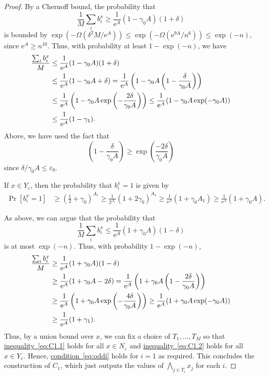 \documentclass[11pt]{article}
\numberwithin{equation}{section}
\theoremstyle{definition}
\theoremstyle{plain}
\newcommand{\eee}{\mathrm e}
\newcommand{\expeqref}[2]{\hyperref[#2]{#1~\eqref{#2}}}
\newcommand{\prob}[2]{\mathop{\mathrm{Pr}}_{#1}[#2]}
\begin{document}
\begin{proof}
By a Chernoff bound, the probability that
\[
  \frac{1}{M}\sum_i b_i^x\geq \frac{1}{\eee^A}(1-\gamma_0A)(1+\delta)
\]
is bounded by
$\exp(-\Omega(\delta^2M/\eee^A))\leq \exp(-\Omega(\eee^{9A}/n^6))\leq
\exp(-n)$, since $\eee^A \geq n^{10}$. Thus, with probability at least
$1-\exp(-n)$, we have
\begin{align}
\frac{\sum_i b_i^x}{M}&\leq \frac{1}{\eee^A}(1-\gamma_0A)(1+\delta)\notag\\
&\leq \frac{1}{\eee^A}(1-\gamma_0A + \delta) = \frac{1}{\eee^A}\left(1-\gamma_0A\left(1-\frac{\delta}{\gamma_0A}\right)\right)\notag\\
&\leq \frac{1}{\eee^A}\left(1-\gamma_0A\exp\left(-\frac{2\delta}{\gamma_0A}\right)\right)\leq \frac{1}{\eee^A}(1-\gamma_0A\exp(-\gamma_0A))\notag\\
&\leq \frac{1}{\eee^A}(1-\gamma_1).\label{eq:C1.1}
\end{align}
%
Above, we have used the fact that
\[
  \left(1-\frac{\delta}{\gamma_0A}\right)\geq \exp\left(\frac{-2\delta}{\gamma_0A}\right)
\]
since $\delta/\gamma_0A \leq \varepsilon_0$.

If $x\in Y_\varepsilon$, then the probability that $b_i^x = 1$ is given by 
\begin{align*}
\prob{}{b_i^x = 1} &\geq \left(\frac{1}{2}+ \gamma_0\right)^{A_1}
%
%
\geq \frac{1}{2^{A_1}} \left(1+2\gamma_0\right)^{A_1} 
\geq \frac{1}{\eee^A}(1+\gamma_0{A_1})
%
%
\geq \frac{1}{\eee^A}(1+\gamma_0A).
\end{align*}

As above, we can argue that the probability that
\[
  \frac{1}{M}\sum_i b_i^x \leq \frac{1}{\eee^A}(1+\gamma_0A)(1-\delta)
\]
is at most $\exp(-n)$. Thus, with probability $1-\exp(-n)$,
\begin{align}
\frac{\sum_i b_i^x}{M}&\geq \frac{1}{\eee^A}(1+\gamma_0A)(1-\delta)\notag\\
&\geq \frac{1}{\eee^A}(1+\gamma_0A -2\delta) = \frac{1}{\eee^A}\left(1+\gamma_0A\left(1-\frac{2\delta}{\gamma_0A}\right)\right)\notag\\
&\geq \frac{1}{\eee^A}\left(1+\gamma_0A\exp\left(-\frac{4\delta}{\gamma_0A}\right)\right)\geq \frac{1}{\eee^A}(1+\gamma_0A\exp(-\gamma_0A))\notag\\
&\geq \frac{1}{\eee^A}(1+\gamma_1).\label{eq:C1.2}
\end{align}
Thus, by a union bound over $x$, we can fix a choice of $T_1,\ldots,T_M$ so that \expeqref{inequality}{eq:C1.1} holds for all $x\in N_\varepsilon$ and \expeqref{inequality}{eq:C1.2} holds for all $x\in Y_\varepsilon$. Hence, \expeqref{condition}{eq:oddi} holds for $i=1$ as required. This concludes the construction of $C_1$, which just outputs the values of $\bigwedge_{j\in T_i}x_j$   for each $i$.
 

\end{proof}
\end{document}
